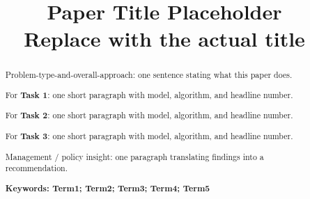 \documentclass[12pt]{article}  %
\title{Paper Title Placeholder \\ Replace with the actual title}  %
\begin{document}
\begin{abstract}


    Problem-type-and-overall-approach: one sentence stating what this paper does.

    For \textbf{Task 1}: one short paragraph with model, algorithm, and headline number.

    For \textbf{Task 2}: one short paragraph with model, algorithm, and headline number.

    For \textbf{Task 3}: one short paragraph with model, algorithm, and headline number.

    Management / policy insight: one paragraph translating findings into a recommendation.

    \vspace{5pt}
    \textbf{Keywords: Term1; Term2; Term3; Term4; Term5}

\end{abstract}
\maketitle  %

\tableofcontents  %





\label{MainLastPage} %
\clearpage

\setcounter{page}{1}


\end{document}
